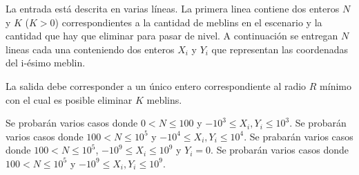 \documentclass{oci}
\begin{document}
\begin{inputDescription}
  La entrada está descrita en varias líneas.
  La primera linea contiene dos enteros $N$ y $K$ ($K>0$) correspondientes a la cantidad
  de meblins en el escenario y la cantidad que hay que eliminar para pasar de nivel.
  A continuación se entregan $N$ lineas cada una conteniendo dos enteros $X_i$ y
  $Y_i$ que representan las coordenadas del i-ésimo meblin.
\end{inputDescription}

\begin{outputDescription}
  La salida debe corresponder a un único entero correspondiente al radio $R$
  mínimo con el cual es posible eliminar $K$ meblins.
\end{outputDescription}

\begin{scoreDescription}
 Se probarán varios casos donde $0 < N \leq 100$ y $-10^3 \leq X_i,Y_i  \leq 10^3$.
 Se probarán varios casos donde $100 < N \leq 10^5$ y $-10^4 \leq X_i, Y_i \leq 10^4$.
 Se prabarán varios casos donde $100 < N \leq 10^5$, $-10^9 \leq X_i \leq 10^9$ y $Y_i = 0$.
 Se probarán varios casos donde $100 < N \leq 10^5$ y $-10^9 \leq X_i, Y_i \leq 10^9$.
\end{scoreDescription}

\begin{sampleDescription}
\end{sampleDescription}
\end{document}
